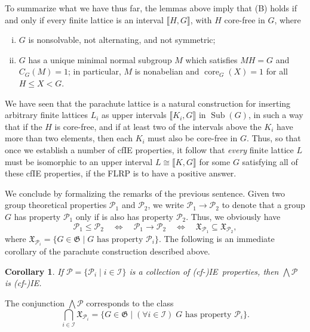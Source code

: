 \documentclass{gen-j-l}
\newcommand{\lb}{\ensuremath{\llbracket}}
\newcommand{\rb}{\ensuremath{\rrbracket}}
\newcommand{\<}{\ensuremath{\langle}}
\renewcommand{\>}{\ensuremath{\rangle}}
\theoremstyle{plain}
\newtheorem{corollary}[theorem]{Corollary}
\theoremstyle{definition}
\theoremstyle{remark}
\numberwithin{theorem}{section}
\numberwithin{claim}{section}
\numberwithin{equation}{section}
\numberwithin{conjecture}{section}
\renewcommand{\leq}{\ensuremath{\leqslant}}
\newcommand{\Meet}{\ensuremath{\bigwedge}}
\newcommand{\Sub}{\ensuremath{\operatorname{Sub}}}
\newcommand{\core}{\ensuremath{\operatorname{core}}}
\newcommand{\2}{\ensuremath{\mathbf{2}}}
\newcommand{\3}{\ensuremath{\mathbf{3}}}
\newcommand{\sG}{\ensuremath{\mathfrak{X}}}
\newcommand{\G}{\ensuremath{\mathfrak{G}}}
\newcommand{\sI}{\ensuremath{\mathscr{I}}}
\newcommand{\sP}{\ensuremath{\mathscr{P}}}
\newcommand{\cP}{\ensuremath{\mathcal{P}}}
\newcommand{\IE}{{\small IE}}
\begin{document}
To summarize what we have thus far, the lemmas above imply that (B) holds if and only if
every finite lattice is an interval $\lb H, G \rb$, with $H$ core-free in $G$, where
\begin{enumerate}[(i)]
\item $G$ is nonsolvable, not alternating, and not symmetric;
\item $G$ has a unique minimal normal subgroup $M$ which satisfies $MH = G$
and $C_G(M) = 1$; in particular,
$M$ is nonabelian and $\core_G(X) = 1$ for all $H\leq X < G$.
\end{enumerate}

We have seen that the parachute lattice is a natural construction for 
inserting arbitrary finite lattices $L_i$ as upper intervals $\lb K_i, G \rb$ in
$\Sub(G)$, in such a way that if the $H$ is core-free, and if 
at least two of the intervals above the $K_i$ have more than two elements, 
then each $K_i$ must also be core-free in $G$.  Thus, so that once we establish
a number of \ac{cfIE} properties, it follow that \emph{every} finite lattice $L$
must be isomorphic to an upper interval $L \cong \lb K, G \rb$ for some $G$
satisfying all of these \ac{cfIE} properties, if the \ac{FLRP} is to have a
positive answer.    

We conclude by formalizing the remarks of the previous sentence.
Given two group theoretical properties $\cP_1$ and $\cP_2$, we write
$\cP_1 \rightarrow \cP_2$ to denote that a group $G$ has property $\cP_1$ only
if is also has property $\cP_2$. 
Thus, we obviously have 
\[
\cP_1 \leq \cP_2\quad  \Longleftrightarrow \quad \cP_1 \rightarrow \cP_2 \quad
\Longleftrightarrow \quad \sG_{\cP_1}\subseteq
\sG_{\cP_2},
\]
where $\sG_{\cP_i} = \{G\in \G \mid G \text{ has property } \cP_i\}$.
The following is an immediate corollary of the parachute construction
described above.
\begin{corollary}
\label{cor:isle-prop-groups-1}
  If $\sP = \{\cP_i \mid i\in \sI\}$ is a collection of (cf-)\IE\ properties,
  then $\Meet \sP$ is (cf-)\IE.
\end{corollary}
\noindent The conjunction $\Meet \sP$ corresponds to the class 
\[
\bigcap_{i\in \sI} \sG_{\cP_i} = \{G \in \G \mid (\forall i \in \sI) \; 
G \text{ has property } \cP_i \}.
\]
 
% 
%

\end{document}
